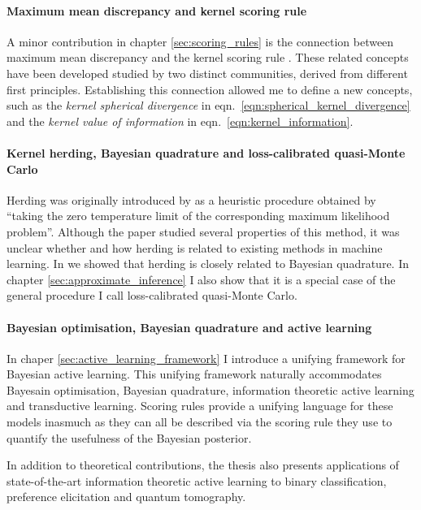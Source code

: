 \paragraph{Maximum mean discrepancy and kernel scoring rule} A minor contribution in chapter \ref{sec:scoring_rules} is the connection between maximum mean discrepancy \citep{Gretton2012} and the kernel scoring rule \citep{Jose2008}. These related concepts have been developed studied by two distinct communities, derived from different first principles. Establishing this connection allowed me to define a new concepts, such as the \emph{kernel spherical divergence} in eqn.\ \eqref{eqn:spherical_kernel_divergence} and the \emph{kernel value of information} in eqn.\ \eqref{eqn:kernel_information}.

\paragraph{Kernel herding, Bayesian quadrature and loss-calibrated quasi-Monte Carlo} Herding was originally introduced by \citet{welling2009herding} as a heuristic procedure obtained by ``taking the zero temperature limit of the corresponding maximum likelihood problem''. Although the paper studied several properties of this method, it was unclear whether and how herding is related to existing methods in machine learning. In \citep{Huszar2012herding} we showed that herding is closely related to Bayesian quadrature. In chapter \ref{sec:approximate_inference} I also show that it is a special case of the general procedure I call loss-calibrated quasi-Monte Carlo.

\paragraph{Bayesian optimisation, Bayesian quadrature and active learning} In chaper \ref{sec:active_learning_framework} I introduce a unifying framework for Bayesian active learning. This unifying framework naturally accommodates Bayesain optimisation, Bayesian quadrature, information theoretic active learning and transductive learning. Scoring rules provide a unifying language for these models inasmuch as they can all be described via the scoring rule they use to quantify the usefulness of the Bayesian posterior.

In addition to theoretical contributions, the thesis also presents applications of state-of-the-art information theoretic active learning to binary classification, preference elicitation and quantum tomography.